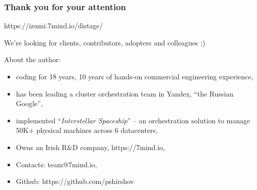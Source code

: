 \documentclass[usenames,dvipsnames]{beamer}
\begin{document}
\begin{frame}
    \frametitle{Thank you for your attention}

    \begin{center}
      https://izumi.7mind.io/distage/

      We're looking for clients, contributors, adopters and colleagues ;)
    \end{center}

    About the author:
    \begin{itemize}
        \item coding for 18 years, 10 years of hands-on commercial engineering experience,
        \item has been leading a cluster orchestration team in Yandex, ``the Russian Google'',
        \item implemented ``\textit{Interstellar Spaceship}'' -- an orchestration solution to manage 50K+ physical machines across 6 datacenters,
        \item Owns an Irish R\&D company, https://7mind.io,
        \item Contacts: team@7mind.io,
        \item Github: https://github.com/pshirshov
    \end{itemize}
\end{frame}
\end{document}
